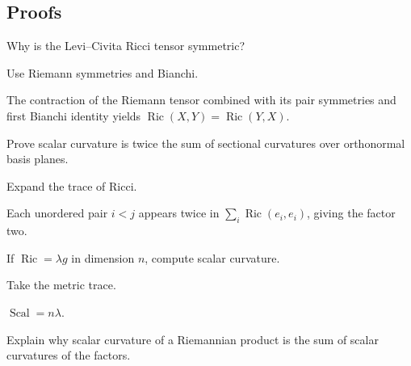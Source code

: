 \subsection*{Proofs}

\begin{exercise}\label{exr:vii27-ped-06}
Why is the Levi--Civita Ricci tensor symmetric?
\end{exercise}

\begin{hint}
Use Riemann symmetries and Bianchi.
\end{hint}

\begin{solution}
The contraction of the Riemann tensor combined with its pair symmetries and first Bianchi identity yields \(\operatorname{Ric}(X,Y)=\operatorname{Ric}(Y,X)\).
\end{solution}

\begin{exercise}\label{exr:vii27-ped-07}
Prove scalar curvature is twice the sum of sectional curvatures over orthonormal basis planes.
\end{exercise}

\begin{hint}
Expand the trace of Ricci.
\end{hint}

\begin{solution}
Each unordered pair \(i<j\) appears twice in \(\sum_i\operatorname{Ric}(e_i,e_i)\), giving the factor two.
\end{solution}

\begin{exercise}\label{exr:vii27-ped-08}
If \(\operatorname{Ric}=\lambda g\) in dimension \(n\), compute scalar curvature.
\end{exercise}

\begin{hint}
Take the metric trace.
\end{hint}

\begin{solution}
\(\operatorname{Scal}=n\lambda\).
\end{solution}

\begin{exercise}\label{exr:vii27-ped-09}
Explain why scalar curvature of a Riemannian product is the sum of scalar curvatures of the factors.
\end{exercise}

